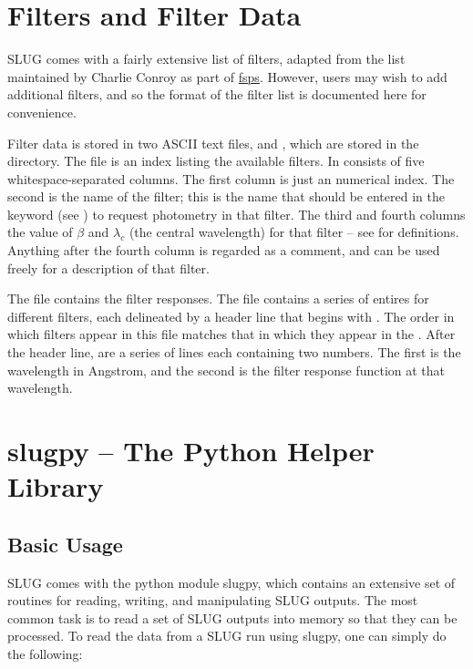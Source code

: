 \documentclass[letterpaper,10pt,english]{sphinxmanual}
\begin{document}
\chapter{Filters and Filter Data}
\label{filters:sec-filters}\label{filters::doc}\label{filters:filters-and-filter-data}
SLUG comes with a fairly extensive list of filters, adapted from the list maintained by Charlie Conroy as part of \href{https://code.google.com/p/fsps/}{fsps}. However, users may wish to add additional filters, and so the format of the filter list is documented here for convenience.

Filter data is stored in two ASCII text files,  and , which are stored in the  directory. The  file is an index listing the available filters. In consists of five whitespace-separated columns. The first column is just an numerical index. The second is the name of the filter; this is the name that should be entered in the  keyword (see {\hyperref[parameters:ssec-phot-keywords]{\emph{}}}) to request photometry in that filter. The third and fourth columns the value of \(\beta\) and \(\lambda_c\) (the central wavelength) for that filter -- see {\hyperref[intro:ssec-spec-phot]{\emph{}}} for definitions. Anything after the fourth column is regarded as a comment, and can be used freely for a description of that filter.

The  file contains the filter responses. The file contains a series of entires for different filters, each delineated by a header line that begins with \code{\#}. The order in which filters appear in this file matches that in which they appear in the . After the header line, are a series of lines each containing two numbers. The first is the wavelength in Angstrom, and the second is the filter response function at that wavelength.


\chapter{slugpy -- The Python Helper Library}
\label{slugpy:slugpy-the-python-helper-library}\label{slugpy:sec-slugpy}\label{slugpy::doc}

\section{Basic Usage}
\label{slugpy:basic-usage}
SLUG comes with the python module slugpy, which contains an extensive set of routines for reading, writing, and manipulating SLUG outputs. The most common task is to read a set of SLUG outputs into memory so that they can be processed. To read the data from a SLUG run using slugpy, one can simply do the following:
\end{document}
